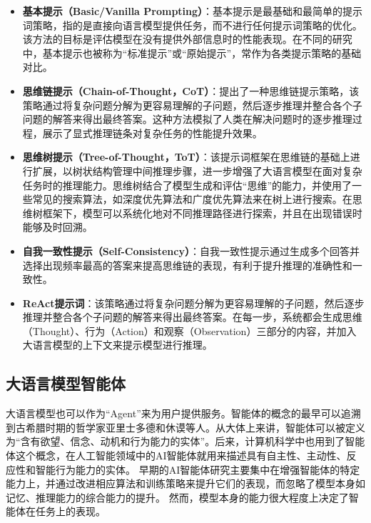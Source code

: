 \begin{itemize}
    \item \textbf{基本提示（Basic/Vanilla Prompting）}：基本提示是最基础和最简单的提示词策略，指的是直接向语言模型提供任务，而不进行任何提示词策略的优化。该方法的目标是评估模型在没有提供外部信息时的性能表现。在不同的研究中，基本提示也被称为“标准提示”或“原始提示”，常作为各类提示策略的基础对比。
    \item \textbf{思维链提示（Chain-of-Thought，CoT）}：\cite{Wang2023a}提出了一种思维链提示策略，该策略通过将复杂问题分解为更容易理解的子问题，然后逐步推理并整合各个子问题的解答来得出最终答案。这种方法模拟了人类在解决问题时的逐步推理过程，展示了显式推理链条对复杂任务的性能提升效果。
    \item \textbf{思维树提示（Tree-of-Thought，ToT）}：该提示词框架在思维链的基础上进行扩展，以树状结构管理中间推理步骤，进一步增强了大语言模型在面对复杂任务时的推理能力。思维树结合了模型生成和评估“思维”的能力，并使用了一些常见的搜索算法，如深度优先算法和广度优先算法来在树上进行搜索。在思维树框架下，模型可以系统化地对不同推理路径进行探索，并且在出现错误时能够及时回溯。
    \item \textbf{自我一致性提示（Self-Consistency）}：自我一致性提示通过生成多个回答并选择出现频率最高的答案来提高思维链的表现，有利于提升推理的准确性和一致性。
    \item \textbf{ReAct提示词}：该策略通过将复杂问题分解为更容易理解的子问题，然后逐步推理并整合各个子问题的解答来得出最终答案。在每一步，系统都会生成思维（Thought）、行为（Action）和观察（Observation）三部分的内容，并加入大语言模型的上下文来提示模型进行推理。
\end{itemize}

\subsection{大语言模型智能体}

大语言模型也可以作为“Agent”来为用户提供服务。智能体的概念的最早可以追溯到古希腊时期的哲学家亚里士多德和休谟等人\cite{Zalta2019}。从大体上来讲，智能体可以被定义为“含有欲望、信念、动机和行为能力的实体”\cite{Xi2023}。后来，计算机科学中也用到了智能体这个概念，在人工智能领域中的AI智能体就用来描述具有自主性、主动性、反应性和智能行为能力的实体\cite{Wooldridge1995}。
早期的AI智能体研究主要集中在增强智能体的特定能力上\cite{Sutton2018}，并通过改进相应算法和训练策略来提升它们的表现，而忽略了模型本身如记忆、推理能力的综合能力的提升。
然而，模型本身的能力很大程度上决定了智能体在任务上的表现。

